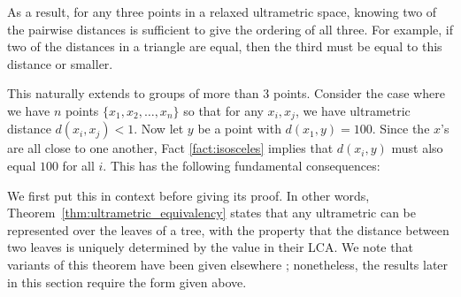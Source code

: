 As a result, for any three points in a relaxed ultrametric space, knowing two of the pairwise distances is sufficient to give the ordering of all three. For example, if two of the distances in a triangle are equal, then the third must be equal to this distance or smaller.

This naturally extends to groups of more than 3 points. Consider the case where we have $n$ points $\{x_1, x_2, \ldots, x_n\}$ so that for any $x_i, x_j$, we have ultrametric distance $d(x_i, x_j) < 1$. Now let $y$ be a point with $d(x_1, y) = 100$. Since the $x$'s are all close to one another, Fact \ref{fact:isosceles} implies that $d(x_i, y)$ must also equal $100$ for all $i$. This has the following fundamental consequences:


\UltrametricEquivalency*

We first put this in context before giving its proof. In other words, Theorem~\ref{thm:ultrametric_equivalency} states that any ultrametric can be represented over the leaves of a tree, with the property that the distance between two leaves is uniquely determined by the value in their LCA. We note that variants of this theorem have been given elsewhere \cite{ultrametric_minimax, ultrametric_single_linkage, hierarchical_clustering_combinations}; nonetheless, the results later in this section require the form given above.

